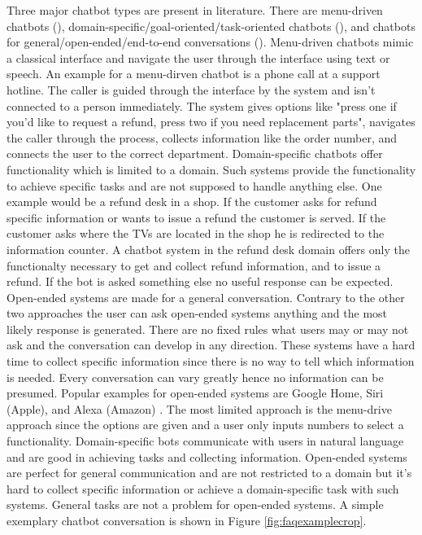 Three major chatbot types are present in literature.
There are menu-driven chatbots (\citet{singhbuilding}), domain-specific/goal-oriented/task-oriented chatbots (\citet{deshpande2017survey, luis2015williams, braunEvaluatingNLU, williams2017hybrid}),
and chatbots for general/open-ended/end-to-end conversations (\citet{brandtzaeg2018chatbots, singhbuilding}).
Menu-driven chatbots mimic a classical interface and navigate the user through the 
interface using text or speech.
An example for a menu-dirven chatbot is a phone call at a support hotline.
The caller is guided through the interface by the system and isn't connected to a person immediately.
The system gives options like "press one if you'd like to request a refund, press two 
if you need replacement parts", navigates the caller through the process, collects information like the order number, and 
connects the user to the correct department.
Domain-specific chatbots offer functionality which is limited to a domain.
Such systems provide the functionality to achieve specific tasks and are not supposed to handle anything else.
One example would be a refund desk in a shop.
If the customer asks for refund specific information or wants to issue a refund the customer is served.
If the customer asks where the TVs are located in the shop he is redirected to the information counter.
A chatbot system in the refund desk domain offers only the functionalty necessary to get and collect refund information, 
and to issue a refund. If the bot is asked something else no useful response can be expected.
Open-ended systems are made for a general conversation.
Contrary to the other two approaches the user can ask open-ended systems anything and the most likely response is generated.
There are no fixed rules what users may or may not ask and the conversation can develop in any direction.
These systems have a hard time to collect specific information since there is no way to tell which information is needed.
Every conversation can vary greatly hence no information can be presumed.
Popular examples for open-ended systems are Google Home, Siri (Apple), and Alexa (Amazon) \cite{singhbuilding}.
The most limited approach is the menu-drive approach since the options are given and a user only inputs numbers to select a functionality.
Domain-specific bots communicate with users in natural language and are good in achieving tasks and collecting information.
Open-ended systems are perfect for general communication and are not restricted to a domain but it's hard to collect specific information
or achieve a domain-specific task with such systems. General tasks are not a problem for open-ended systems.
A simple exemplary chatbot conversation is shown in Figure \ref{fig:faqexamplecrop}.

